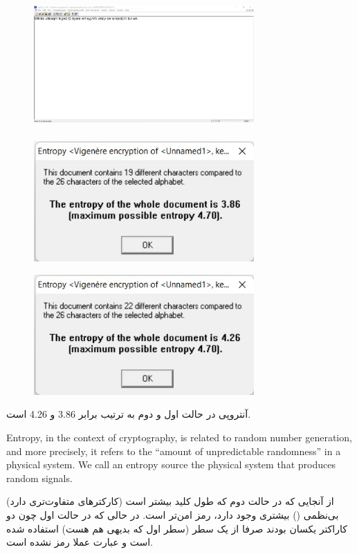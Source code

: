 \documentclass{article}
\begin{document}
\begin{figure}[H]
    \centering
    \includegraphics[width=0.75\textwidth]{figures/3bc.jpg}
    \caption
	{}
    \label{fig:fig1}
\end{figure}

\subsubsection{}
\begin{figure}[H]
    \centering
    \includegraphics[width=0.75\textwidth]{figures/3ca.jpg}
    \caption
	{}
    \label{fig:fig1}
\end{figure}
\begin{figure}[H]
    \centering
    \includegraphics[width=0.75\textwidth]{figures/3cb.jpg}
    \caption
	{}
    \label{fig:fig1}
\end{figure}
آنتروپی در حالت اول و دوم به ترتیب برابر 3.86 و 4.26 است.
\begin{latin}
Entropy, in the context of cryptography, is related to random number generation, and more precisely, it refers to the “amount of unpredictable randomness” in a physical system. We call an entropy source the physical system that produces random signals.
\end{latin}
از آنجایی که در حالت دوم که طول کلید بیشتر است (کارکترهای متفاوت‌تری دارد) بی‌نظمی () بیشتری وجود دارد، رمز امن‌تر است. در حالی که در حالت اول چون دو کاراکتر یکسان بودند صرفا از یک سطر (سطر اول که بدیهی هم هست) استفاده شده است و عبارت عملا رمز نشده است.
\end{document}
